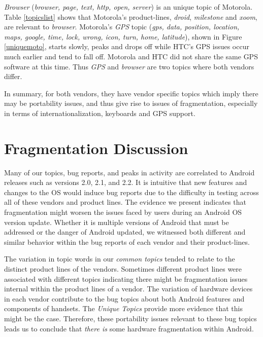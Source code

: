 \documentclass[10pt, conference, compsocconf]{IEEEtran}
\begin{document}
\textit{Browser} (\textit{browser, page, text, http, open, server}) is
an unique topic of Motorola. Table \ref{topicslist} shows that
Motorola's product-lines,
\textit{droid}, \textit{milestone} and \textit{xoom}, are relevant
to \textit{browser}.
Motorola's \textit{GPS} topic
(\textit{gps, data, position, location, maps, google, time, lock,
  wrong, icon, turn, home, latitude}), shown in Figure
\ref{uniquemoto},
starts slowly, peaks and drops off while HTC's GPS issues occur much
earlier and tend to fall off.
Motorola and HTC did not share the same GPS software at this
time. Thus \emph{GPS} and \emph{browser} are two topics where both vendors differ.

In summary, for both vendors, they have vendor specific topics which imply
there may be portability issues, and thus give rise to issues of
fragmentation, especially in terms of internationalization, keyboards and
GPS support.

\section{Fragmentation Discussion}
\label{sec:fragmentation}


Many of our topics, bug reports, and peaks in activity are correlated
to Android releases such as versions 2.0, 2.1, and 2.2. It is
intuitive that new features and changes to the OS would induce bug
reports due to the difficulty in testing across all of these vendors
and product lines. The evidence we present indicates that
fragmentation might worsen the issues faced by users during an Android
OS version update.
Whether it is multiple versions of Android that must be addressed or
the danger of Android updated, we witnessed both different and similar
behavior within the bug reports of each vendor and their product-lines.


The variation in topic words in our \emph{common topics} tended to
relate to the distinct product lines of the vendors. Sometimes
different product lines were associated with different topics
indicating there might be fragmentation issues internal within the
product lines of a vendor.  The variation of hardware devices in each
vendor contribute to the bug topics about both Android features and
components of handsets. The \textit{Unique Topics} provide more
evidence that this might be the case.  Therefore, these portability
issues relevant to these bug topics leads us to conclude that \emph{there is}
some hardware fragmentation within Android.
\end{document}
